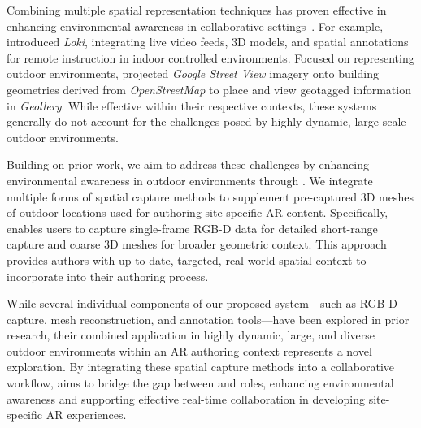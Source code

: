 Combining multiple spatial representation techniques has proven effective in enhancing environmental awareness in collaborative settings~\cite{teo360DropsMixedReality2019,thoravikumaravelLokiFacilitatingRemote2019,youngMobileportationNomadicTelepresence2020,sakashitaSharedNeRFLeveragingPhotorealistic2024,tianUsingVirtualReplicas2023,reynoldsPopMetaverseMultiUserMultiTasking2024,luRevivingEustonArch2023}. For example, \citet{thoravikumaravelLokiFacilitatingRemote2019} introduced \textit{Loki}, integrating live video feeds, 3D models, and spatial annotations for remote instruction in indoor controlled environments. Focused on representing outdoor environments, \citet{duGeolleryMixedReality2019} projected \textit{Google Street View} imagery onto building geometries derived from \textit{OpenStreetMap} to place and view geotagged information in \textit{Geollery}. While effective within their respective contexts, these systems generally do not account for the challenges posed by highly dynamic, large-scale outdoor environments.

Building on prior work, we aim to address these challenges by enhancing environmental awareness in outdoor environments through \SystemName. We integrate multiple forms of spatial capture methods to supplement pre-captured 3D meshes of outdoor locations used for authoring site-specific AR content. Specifically, \SystemName enables \insitu users to capture single-frame RGB-D data for detailed short-range capture and coarse 3D meshes for broader geometric context. This approach provides \exsitu authors with up-to-date, targeted, real-world spatial context to incorporate into their authoring process.

While several individual components of our proposed system---such as RGB-D capture, mesh reconstruction, and annotation tools---have been explored in prior research, their combined application in highly dynamic, large, and diverse outdoor environments within an AR authoring context represents a novel exploration. By integrating these spatial capture methods into a collaborative workflow, \SystemName aims to bridge the gap between \exsitu and \insitu roles, enhancing environmental awareness and supporting effective real-time collaboration in developing site-specific AR experiences.
